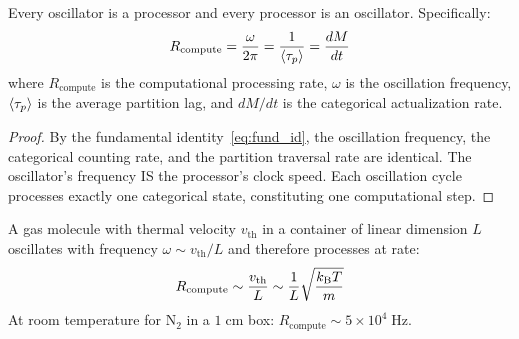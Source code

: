 \begin{theorem}
\label{thm:proc_osc}
Every oscillator is a processor and every processor is an oscillator. Specifically:
\begin{equation}
    R_{\mathrm{compute}} = \frac{\omega}{2\pi} = \frac{1}{\langle\tau_p\rangle} = \frac{dM}{dt}
\end{equation}
where $R_{\mathrm{compute}}$ is the computational processing rate, $\omega$ is the oscillation frequency, $\langle\tau_p\rangle$ is the average partition lag, and $dM/dt$ is the categorical actualization rate.
\end{theorem}

\begin{proof}
By the fundamental identity~\eqref{eq:fund_id}, the oscillation frequency, the categorical counting rate, and the partition traversal rate are identical. The oscillator's frequency IS the processor's clock speed. Each oscillation cycle processes exactly one categorical state, constituting one computational step.
\end{proof}

\begin{corollary}
A gas molecule with thermal velocity $v_{\mathrm{th}}$ in a container of linear dimension $L$ oscillates with frequency $\omega \sim v_{\mathrm{th}}/L$ and therefore processes at rate:
\begin{equation}
    R_{\mathrm{compute}} \sim \frac{v_{\mathrm{th}}}{L} \sim \frac{1}{L}\sqrt{\frac{k_{\mathrm{B}} T}{m}}
\end{equation}
At room temperature for $\mathrm{N}_2$ in a $1\;\mathrm{cm}$ box: $R_{\mathrm{compute}} \sim 5 \times 10^4\;\mathrm{Hz}$.
\end{corollary}

